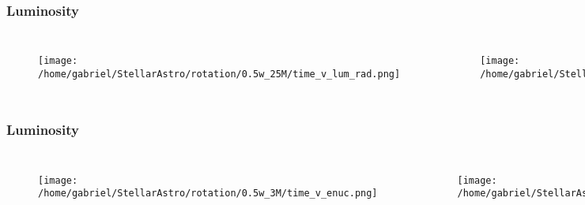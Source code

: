 \documentclass{beamer}
\begin{document}
\begin{frame}
\frametitle{Luminosity}
        \begin{columns}[c]
\begin{figure}
    \begin{center}
      \texttt{[image: /home/gabriel/StellarAstro/rotation/0.5w\_25M/time\_v\_lum\_rad.png]}
    \end{center}
  \end{figure}

        \begin{figure}
    \begin{center}
      \texttt{[image: /home/gabriel/StellarAstro/rotation/0.9w\_25M/time\_v\_lum\_rad.png]}
    \end{center}
  \end{figure}

        \end{columns}
\end{frame}



\begin{frame}
\frametitle{Luminosity}
        \begin{columns}[c]
\begin{figure}
    \begin{center}
      \texttt{[image: /home/gabriel/StellarAstro/rotation/0.5w\_3M/time\_v\_enuc.png]}
    \end{center}
  \end{figure}

        \begin{figure}
    \begin{center}
      \texttt{[image: /home/gabriel/StellarAstro/rotation/0.9w\_3M/time\_v\_enuc.png]}
    \end{center}
  \end{figure}

        \end{columns}
\end{frame}

\end{document}
